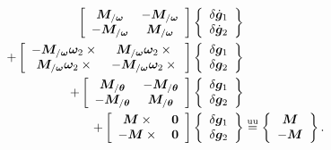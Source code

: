 \documentclass[10pt,fleqn,subeqn]{report}
\newcommand{\T}[1]{\bm{#1}}
\newcommand{\equu}{\overset{\text{uu}}{=}}
\begin{document}
\begin{align}
	\sqbr{\matr{cc}{
		\T{M}_{/\T{\omega}} & - \T{M}_{/\T{\omega}} \\
		- \T{M}_{/\T{\omega}} & \T{M}_{/\T{\omega}}
	}}\cubr{\cvvect{
		\delta\dot{\T{g}}_1 \\
		\delta\dot{\T{g}}_2
	}} & \nonumber \\
	+ \sqbr{\matr{cc}{
		- \T{M}_{/\T{\omega}} \T{\omega}_2 \times{} & \T{M}_{/\T{\omega}} \T{\omega}_2 \times{} \\
		\T{M}_{/\T{\omega}} \T{\omega}_2 \times{} & - \T{M}_{/\T{\omega}} \T{\omega}_2 \times{}
	}} \cubr{\cvvect{
		\delta\T{g}_1 \\
		\delta\T{g}_2 
	}} & \nonumber \\
	+ \sqbr{\matr{cc}{
		\T{M}_{/\T{\theta}} & - \T{M}_{/\T{\theta}} \\
		- \T{M}_{/\T{\theta}} & \T{M}_{/\T{\theta}}
	}} \cubr{\cvvect{
		\delta\T{g}_1 \\
		\delta\T{g}_2 
	}} & \nonumber \\
	+ \sqbr{\matr{cc}{
		\T{M}\times{} & \T{0} \\
		- \T{M}\times{} & \T{0}
	}} \cubr{\cvvect{
		\delta\T{g}_1 \\
		\delta\T{g}_2 
	}} &\equu \cubr{\cvvect{
		\T{M} \\
		- \T{M}
	}} .
\end{align}
\end{document}
